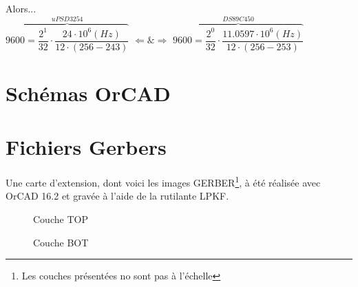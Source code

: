 \documentclass[10pt,a4paper,final]{article}
\begin{document}
\begin{spacing}{1.5}

Alors...\\


$\overbrace{9600 = \dfrac{2^{1}}{32} \cdot \dfrac{24\cdot10^{6}(Hz)}{12\cdot(256 - 243)}}^{uPSD 3254} $ $\Leftarrow \& \Rightarrow $ $ \overbrace{9600 = \dfrac{2^{0}}{32}\cdot \dfrac{11.0597 \cdot 10^{6}(Hz)}{12\cdot(256 - 253)}}^{DS89C450}$
\pagebreak

\section{Schémas OrCAD}


\section{Fichiers Gerbers}
Une carte d'extension, dont voici les images GERBER\footnote{Les couches présentées no sont pas à l'échelle}, à été réalisée avec OrCAD 16.2 et gravée à l'aide de la rutilante LPKF.

\begin{figure}[hbtp]
\caption{Couche TOP}
\centering
{}

\bigskip
\bigskip
\bigskip
\bigskip
\bigskip

\caption{Couche BOT}
\end{figure}


\end{spacing}
\end{document}
